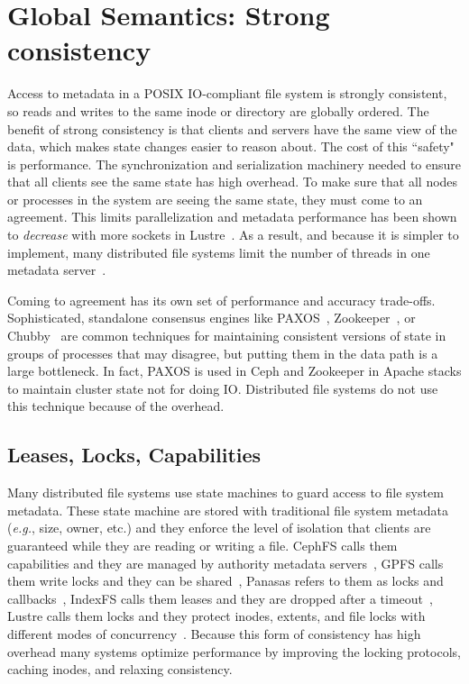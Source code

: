 \section{Global Semantics: Strong consistency}

Access to metadata in a POSIX IO-compliant file system is strongly consistent,
so reads and writes to the same inode or directory are globally ordered.  The
benefit of strong consistency is that clients and servers have the same view of
the data, which makes state changes easier to reason about.  The cost of this
``safety" is performance.  The synchronization and serialization machinery
needed to ensure that all clients see the same state has high overhead.  To
make sure that all nodes or processes in the system are seeing the same state,
they must come to an agreement.  This limits parallelization and metadata
performance has been shown to {\it decrease} with more sockets in
Lustre~\cite{konstantinos:pdsw2014-lustre-metadata}. As a result, and because
it is simpler to implement, many distributed file systems limit the number of
threads in one metadata server~\cite{weil:osdi2006-ceph,
alam:pdsw2011-metadata-scaling, ren:sc2014-indexfs}. 

Coming to agreement has its own set of performance and accuracy trade-offs.
Sophisticated, standalone consensus engines like
PAXOS~\cite{lamport_parttime_1998}, Zookeeper~\cite{hunt_zookeeper_2010}, or
Chubby~\cite{burrows_chubby_2006} are common techniques for maintaining
consistent versions of state in groups of processes that may disagree, but
putting them in the data path is a large bottleneck. In fact, PAXOS is used in
Ceph and Zookeeper in Apache stacks to maintain cluster state not for doing IO.
Distributed file systems do not use this technique because of the overhead.

\subsection{Leases, Locks, Capabilities}

Many distributed file systems use state machines to guard access to file system
metadata.  These state machine are stored with traditional file system metadata
({\it e.g.}, size, owner, etc.) and they enforce the level of isolation that
clients are guaranteed while they are reading or writing a file. CephFS calls
them capabilities and they are managed by authority metadata servers~\cite{},
GPFS calls them write locks and they can be shared~\cite{}, Panasas refers to
them as locks and callbacks~\cite{}, IndexFS calls them leases and they are
dropped after a timeout~\cite{}, Lustre calls them locks and they protect
inodes, extents, and file locks with different modes of
concurrency~\cite{wang:tech09-lustre}.  Because this form of consistency has
high overhead many systems optimize performance by improving the locking
protocols, caching inodes, and relaxing consistency.

